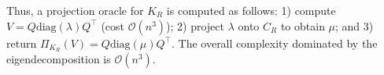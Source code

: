 \documentclass[11pt,letterpaper]{article}
\begin{document}
\begin{itemize}
  Thus, a projection oracle for $K_R$ is computed as follows: 1) compute $V = Q  \mathrm{diag}(\lambda) Q^\top$ (cost $\mathcal{O}(n^3)$); 2) project $\lambda$ onto $C_R$ to obtain $\mu$; and 3) return $\Pi_{K_R}(V) = Q \mathrm{diag}(\mu) Q^\top$. The overall complexity dominated by the eigendecomposition is $\mathcal{O}(n^3)$.
\end{itemize}
\end{document}
